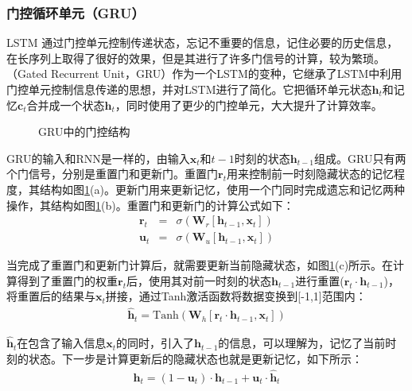 \subsubsection{门控循环单元（GRU）}

\parinterval LSTM 通过门控单元控制传递状态，忘记不重要的信息，记住必要的历史信息，在长序列上取得了很好的效果，但是其进行了许多门信号的计算，较为繁琐。{\small{}}（Gated Recurrent Unit，GRU）作为一个LSTM的变种，它继承了LSTM中利用门控单元控制信息传递的思想，并对LSTM进行了简化\cite{Cho2014Learning}。它把循环单元状态$\mathbf{h}_t$和记忆$\mathbf{c}_t$合并成一个状态$\mathbf{h}_t$，同时使用了更少的门控单元，大大提升了计算效率。

\begin{figure}[htp]
\centering
\subfigure[重置门]{}
\subfigure[更新门]{}
\subfigure[隐藏状态更新]{}
\caption{GRU中的门控结构}
\label{fig:6-17}
\end{figure}

\parinterval GRU的输入和RNN是一样的，由输入$\mathbf{x}_t$和$t-1$时刻的状态$\mathbf{h}_{t-1}$组成。GRU只有两个门信号，分别是重置门和更新门。重置门$\mathbf{r}_t$用来控制前一时刻隐藏状态的记忆程度，其结构如图\ref{fig:6-17}(a)。更新门用来更新记忆，使用一个门同时完成遗忘和记忆两种操作，其结构如图\ref{fig:6-17}(b)。重置门和更新门的计算公式如下：
\begin{eqnarray}
\mathbf{r}_t & = &\sigma (\mathbf{W}_r [\mathbf{h}_{t-1},\mathbf{x}_{t}] ) \label{eq:6-18} \\
\mathbf{u}_t & = & \sigma (\mathbf{W}_u [\mathbf{h}_{t-1},\mathbf{x}_{t}]) \label{eq:6-19}
\end{eqnarray}

\parinterval 当完成了重置门和更新门计算后，就需要更新当前隐藏状态，如图\ref{fig:6-17}(c)所示。在计算得到了重置门的权重$\mathbf{r}_t$后，使用其对前一时刻的状态$\mathbf{h}_{t-1}$进行重置($\mathbf{r}_t \cdot \mathbf{h}_{t-1}$)，将重置后的结果与$\mathbf{x}_t$拼接，通过Tanh激活函数将数据变换到[-1,1]范围内：
\begin{eqnarray}
\hat{\mathbf{h}}_t = \textrm{Tanh} (\mathbf{W}_h [\mathbf{r}_t \cdot \mathbf{h}_{t-1},\mathbf{x}_{t}])
\label{eq:6-20}
\end{eqnarray}

\parinterval $\hat{\mathbf{h}}_t$在包含了输入信息$\mathbf{x}_t$的同时，引入了$\mathbf{h}_{t-1}$的信息，可以理解为，记忆了当前时刻的状态。下一步是计算更新后的隐藏状态也就是更新记忆，如下所示：
\begin{eqnarray}
\mathbf{h}_t = (1-\mathbf{u}_t) \cdot \mathbf{h}_{t-1} +\mathbf{u}_t \cdot \hat{\mathbf{h}}_t
\label{eq:6-21}
\end{eqnarray}

